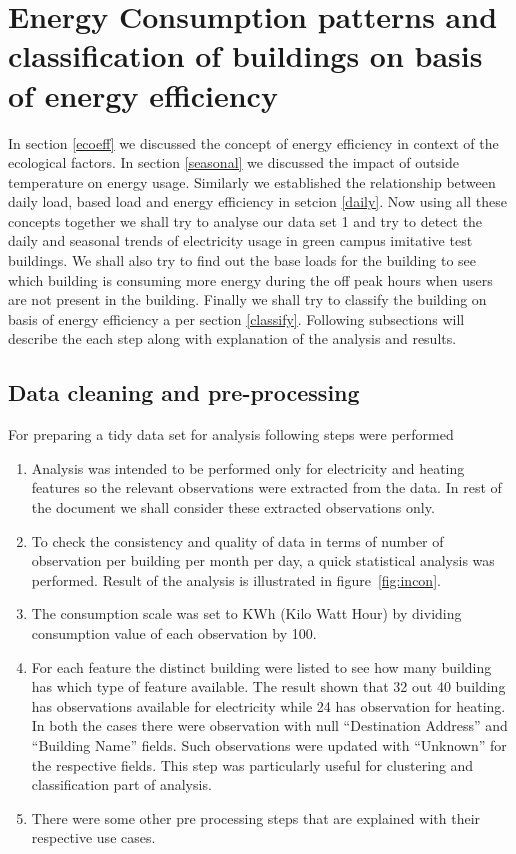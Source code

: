\section{Energy Consumption patterns and classification of buildings on basis of energy efficiency}
In section \ref{ecoeff} we discussed the concept of energy efficiency in context of the ecological factors. In section \ref{seasonal} we discussed the impact of outside temperature on energy usage. Similarly we established the relationship between daily load, based load and energy efficiency in setcion \ref{daily}. Now using all these concepts together we shall try to analyse our data set 1 and try to detect the daily and seasonal trends of electricity usage in green campus imitative  test buildings. We shall also try to find out the base loads for the building to see which building is consuming more energy during the off peak hours when users are not present in the building. Finally we shall try to classify the building on basis of energy efficiency a per section \ref{classify}. Following subsections will describe the each step along with explanation of the analysis and results.
\subsection{Data cleaning and pre-processing} \label{cleaning}
For preparing a tidy data set for analysis following steps were performed
\begin{enumerate}
\item Analysis was intended to be performed only for electricity and heating features so the relevant observations were extracted from the data. In rest of the document we shall consider these extracted observations only.
\item To check the consistency and quality of data in terms of number of observation per building per month per day, a quick statistical analysis was performed. Result of the analysis is illustrated in figure~\ref{fig:incon}.
\item The consumption scale was set to KWh (Kilo Watt Hour) by dividing consumption value of each observation by 100.
\item For each feature the distinct building were listed to see how many building has which type of feature available. The result shown that 32 out 40 building has observations available for electricity while 24 has observation for heating. In both the cases there were observation with null ``Destination Address'' and ``Building Name'' fields. Such observations were updated with ``Unknown'' for the respective fields. This step was particularly useful for clustering and classification part of analysis.
\item There were some other pre processing steps that are explained with their respective use cases.
\end{enumerate}

